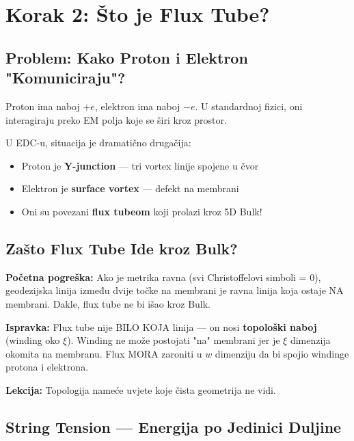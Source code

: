 \documentclass[12pt,a4paper]{article}
\begin{document}
\section{Korak 2: Što je Flux Tube?}

\subsection{Problem: Kako Proton i Elektron "Komuniciraju"?}

Proton ima naboj $+e$, elektron ima naboj $-e$. U standardnoj fizici, oni interagiraju preko EM polja koje se širi kroz prostor.

U EDC-u, situacija je dramatično drugačija:
\begin{itemize}
    \item Proton je \textbf{Y-junction} — tri vortex linije spojene u čvor
    \item Elektron je \textbf{surface vortex} — defekt na membrani
    \item Oni su povezani \textbf{flux tubeom} koji prolazi kroz 5D Bulk!
\end{itemize}

\subsection{Zašto Flux Tube Ide kroz Bulk?}

\begin{correction}
\textbf{Početna pogreška:} Ako je metrika ravna (svi Christoffelovi simboli = 0), geodezijska linija između dvije točke na membrani je ravna linija koja ostaje NA membrani. Dakle, flux tube ne bi išao kroz Bulk.

\textbf{Ispravka:} Flux tube nije BILO KOJA linija — on nosi \textbf{topološki naboj} (winding oko $\xi$). Winding ne može postojati "na" membrani jer je $\xi$ dimenzija okomita na membranu. Flux MORA zaroniti u $w$ dimenziju da bi spojio windinge protona i elektrona.

\textbf{Lekcija:} Topologija nameće uvjete koje čista geometrija ne vidi.
\end{correction}

\subsection{String Tension — Energija po Jedinici Duljine}
\end{document}
